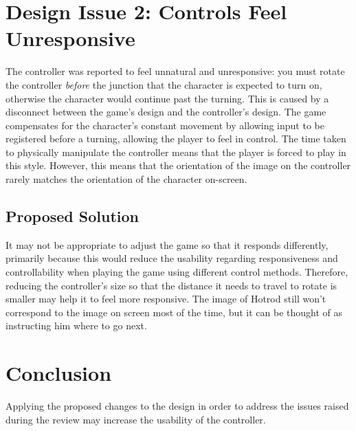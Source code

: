 \documentclass{scrartcl}
\begin{document}
\section{Design Issue 2: Controls Feel Unresponsive}
The controller was reported to feel unnatural and unresponsive: you must rotate the controller \textit{before} the junction that the character is expected to turn on, otherwise the character would continue past the turning. This is caused by a disconnect between the game's design and the controller's design. The game compensates for the character's constant movement by allowing input to be registered before a turning, allowing the player to feel in control. The time taken to physically manipulate the controller means that the player is forced to play in this style. However, this means that the orientation of the image on the controller rarely matches the orientation of the character on-screen. 


\subsection{Proposed Solution}
It may not be appropriate to adjust the game so that it responds differently, primarily because this would reduce the usability regarding responsiveness and controllability when playing the game using different control methods. Therefore, reducing the controller's size so that the distance it needs to travel to rotate is smaller may help it to feel more responsive. The image of Hotrod still won't correspond to the image on screen most of the time, but it can be thought of as instructing him where to go next.

\section{Conclusion}
Applying the proposed changes to the design in order to address the issues raised during the review may increase the usability of the controller.



\end{document}
